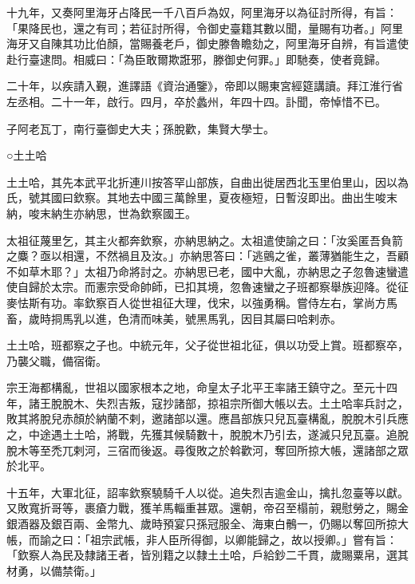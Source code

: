 \begin{pinyinscope}
 十九年，又奏阿里海牙占降民一千八百戶為奴，阿里海牙以為征討所得，有旨：「果降民也，還之有司；若征討所得，令御史臺籍其數以聞，量賜有功者。」阿里海牙又自陳其功比伯顏，當賜養老戶，御史滕魯瞻劾之，阿里海牙自辨，有旨遣使赴行臺逮問。相威曰：「為臣敢爾欺誑邪，滕御史何罪。」即馳奏，使者竟歸。



 二十年，以疾請入覲，進譯語《資治通鑒》，帝即以賜東宮經筵講讀。拜江淮行省左丞相。二十一年，啟行。四月，卒於蠡州，年四十四。訃聞，帝悼惜不已。



 子阿老瓦丁，南行臺御史大夫；孫脫歡，集賢大學士。



 ○土土哈



 土土哈，其先本武平北折連川按答罕山部族，自曲出徙居西北玉里伯里山，因以為氏，號其國曰欽察。其地去中國三萬餘里，夏夜極短，日暫沒即出。曲出生唆末納，唆末納生亦納思，世為欽察國王。



 太祖征蔑里乞，其主火都奔欽察，亦納思納之。太祖遣使諭之曰：「汝奚匿吾負箭之麋？亟以相還，不然禍且及汝。」亦納思答曰：「逃鸇之雀，叢薄猶能生之，吾顧不如草木耶？」太祖乃命將討之。亦納思已老，國中大亂，亦納思之子忽魯速蠻遣使自歸於太宗。而憲宗受命帥師，已扣其境，忽魯速蠻之子班都察舉族迎降。從征麥怯斯有功。率欽察百人從世祖征大理，伐宋，以強勇稱。嘗侍左右，掌尚方馬畜，歲時挏馬乳以進，色清而味美，號黑馬乳，因目其屬曰哈剌赤。



 土土哈，班都察之子也。中統元年，父子從世祖北征，俱以功受上賞。班都察卒，乃襲父職，備宿衛。



 宗王海都構亂，世祖以國家根本之地，命皇太子北平王率諸王鎮守之。至元十四年，諸王脫脫木、失烈吉叛，寇抄諸部，掠祖宗所御大帳以去。土土哈率兵討之，敗其將脫兒赤顏於納蘭不剌，邀諸部以還。應昌部族只兒瓦臺構亂，脫脫木引兵應之，中途遇土土哈，將戰，先獲其候騎數十，脫脫木乃引去，遂滅只兒瓦臺。追脫脫木等至禿兀剌河，三宿而後返。尋復敗之於斡歡河，奪回所掠大帳，還諸部之眾於北平。



 十五年，大軍北征，詔率欽察驍騎千人以從。追失烈吉逾金山，擒扎忽臺等以獻。又敗寬折哥等，裹瘡力戰，獲羊馬輜重甚眾。還朝，帝召至榻前，親慰勞之，賜金銀酒器及銀百兩、金幣九、歲時預宴只孫冠服全、海東白鶻一，仍賜以奪回所掠大帳，而諭之曰：「祖宗武帳，非人臣所得御，以卿能歸之，故以授卿。」嘗有旨：「欽察人為民及隸諸王者，皆別籍之以隸土土哈，戶給鈔二千貫，歲賜粟帛，選其材勇，以備禁衛。」




\end{pinyinscope}
